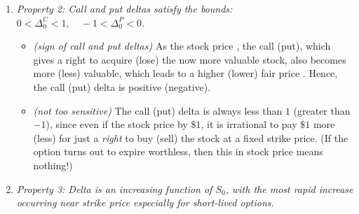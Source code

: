 \begin{enumerate}
\begin{center}
\end{center}

\item \label{it:cp-delta-bounds} \emph{Property 2: Call and put deltas satisfy
the bounds: \(\boxed{0<\Delta_0^C<1,\quad-1<\Delta_0^P<0}\).}
\begin{itemize}
\item \emph{(sign of call and put deltas)} As the stock price
, the call (put), which gives a right to acquire (lose) the
now more valuable stock, also becomes more (less) valuable, which leads to a
higher (lower) fair price . Hence, the call (put) delta is
positive (negative).
\item \emph{(not too sensitive)} The call (put) delta is always less than \(1\)
(greater than \(-1\)), since even if the stock price  by
\(\$1\), it is irrational to pay \(\$1\) more (less) for just a \emph{right} to
buy (sell) the stock at a fixed strike price. (If the option turns out to
expire worthless, then this  in stock price means nothing!)
\end{itemize}

\begin{center}
\end{center}

\item \emph{Property 3: Delta is an increasing function of \(S_0\), with the
most rapid increase occurring near strike price especially for short-lived
options.}


\end{enumerate}
